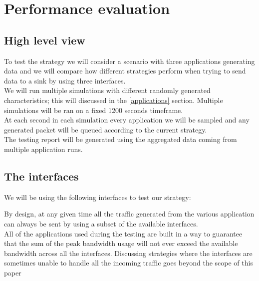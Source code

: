
\section{Performance evaluation}

\subsection{High level view}
To  test the strategy we will consider a scenario with three applications generating data and we will compare how different strategies perform when trying to send data to a sink by using three interfaces. \\
We will run multiple simulations with different randomly generated characteristics; this will discussed in the  \ref{applications} section.
Multiple simulations will be ran on a fixed 1200 seconds timeframe. \\
At each second in each simulation every application we will be sampled and any generated packet will be queued according to the current strategy. \\
The testing report will be generated using the aggregated data coming from multiple application runs. 


\subsection{The interfaces}

We will be using the following interfaces to test our strategy:

\begin{table}[h]
	\centering
\end{table}

\begin{mdframed}[hidealllines=true,backgroundcolor=blue!20]
	By design, at any given time all the traffic generated from the various application can always be sent by using a subset of the available interfaces.\\
	All of the applications used during the testing are built in a way to guarantee that the sum of the peak bandwidth usage will not ever exceed the available bandwidth across all the interfaces.
 Discussing strategies where the interfaces are sometimes unable to handle all the incoming traffic goes beyond the scope of this paper
\end{mdframed} 


